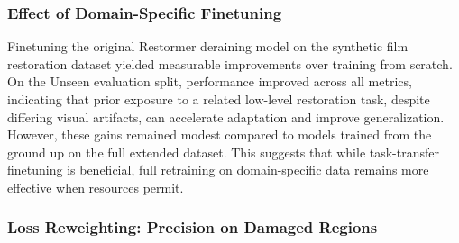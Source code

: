 \documentclass[10pt,a4paper,twocolumn,twoside]{article}
\begin{document}
\subsubsection{Effect of Domain-Specific Finetuning}

Finetuning the original Restormer deraining model on the synthetic film restoration dataset yielded measurable improvements over training from scratch. On the Unseen evaluation split, performance improved across all metrics, indicating that prior exposure to a related low-level restoration task, despite differing visual artifacts, can accelerate adaptation and improve generalization. However, these gains remained modest compared to models trained from the ground up on the full extended dataset. This suggests that while task-transfer finetuning is beneficial, full retraining on domain-specific data remains more effective when resources permit.
\subsubsection{Loss Reweighting: Precision on Damaged Regions}
\end{document}
